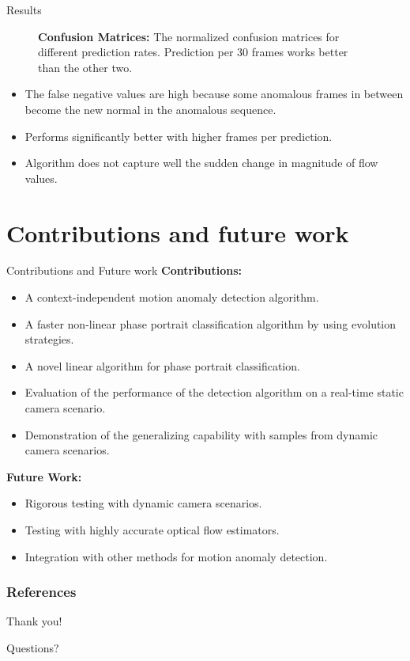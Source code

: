 \documentclass{beamer}
\begin{document}
\begin{frame}{Results}
\begin{figure}[h!]
\begin{subfigure}[t]{.3\textwidth}
    	\end{subfigure}
    	
    	\caption{\textbf{Confusion Matrices:} The normalized confusion matrices for different prediction rates. Prediction per 30 frames works better than the other two. }
    	\label{fit_vary}
    \end{figure}
\begin{itemize}
\item The false negative values are high because some anomalous frames in between become the new normal in the anomalous sequence.
\item Performs significantly better with higher frames per prediction.
\item Algorithm does not capture well the sudden change in magnitude of flow values.
\end{itemize}
\end{frame}








\section{Contributions and future work}
\begin{frame}{Contributions and Future work}
\textbf{Contributions:}
\begin{itemize}
\item A context-independent motion anomaly detection algorithm.
\item A faster non-linear phase portrait classification algorithm by using evolution strategies.
\item A novel linear algorithm for phase portrait classification.
\item Evaluation of the performance of the detection algorithm on a real-time static camera scenario.
\item Demonstration of the generalizing capability with samples from dynamic camera scenarios.
\end{itemize}
\textbf{Future Work:}
\begin{itemize}

\item Rigorous testing with dynamic camera scenarios.
\item Testing with highly accurate optical flow estimators.
\item Integration with other methods for motion anomaly detection.
\end{itemize}

\end{frame}


\begin{frame}
  \frametitle{References}
  \printbibliography[title={References}]	
\end{frame}

\begin{frame}{Thank you!}
	\begin{center}
		Questions?
	\end{center}
\end{frame}
\end{document}
